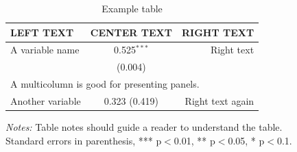 \begin{table}[H]
\setlength\tabcolsep{0pt} %
\centering
\caption{Example table}
    \label{tab:example}
    \begin{threeparttable}
\begin{tabular*}{\linewidth}{@{\extracolsep{\fill}}lcr} \toprule
LEFT TEXT & CENTER TEXT & RIGHT TEXT \\ \midrule
A variable name & 0.525$^{***}$ & Right text \\
 & (0.004) & \\
\multicolumn{3}{l}{A multicolumn is good for presenting panels.} \\
Another variable & 0.323 (0.419) & Right text again \\
\bottomrule
\end{tabular*}
\begin{tablenotes}
    \item \footnotesize{\emph{Notes:} Table notes should guide a reader to understand the table. \\ Standard errors in parenthesis, *** p$<$0.01, ** p$<$0.05, * p$<$0.1.}
\end{tablenotes}
\end{threeparttable}
\end{table}
